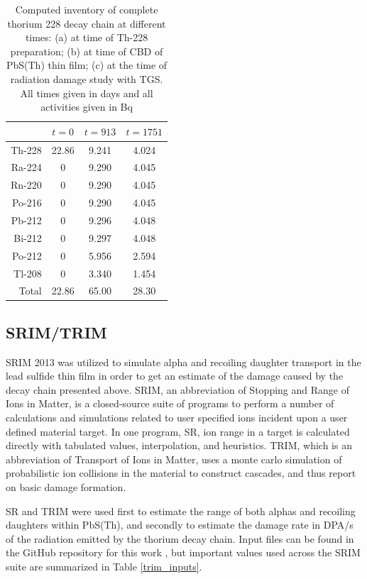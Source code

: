 \begin{table}[th]
\begin{center}
\begin{tabular}{|r|c|c|c|}\hline
		&	$t=0$	&	$t=913$	&	$t=1751$	\\\hline
Th-228	&	22.86	&	9.241	&	4.024	\\
Ra-224	&	0		&	9.290	&	4.045	\\
Rn-220	&	0		&	9.290	&	4.045	\\
Po-216	&	0		&	9.290	&	4.045	\\
Pb-212	&	0		&	9.296	&	4.048	\\
Bi-212	&	0		&	9.297	&	4.048	\\
Po-212	&	0		&	5.956	&	2.594	\\
Tl-208	&	0		&	3.340	&	1.454	\\\hline
Total		&	22.86	&	65.00	&	28.30	\\\hline
\end{tabular}
\end{center}
\caption{Computed inventory of complete thorium 228 decay chain at different times: (a) at time of Th-228 preparation; (b) at time of CBD of PbS(Th) thin film; (c) at the time of radiation damage study with TGS. All times given in days and all activities given in Bq \label{ansatz_decay_chain_inventory}}
\end{table}%


\subsection{SRIM/TRIM}
SRIM 2013 \cite{srim_website} was utilized to simulate alpha and recoiling daughter transport in the lead sulfide thin film in order to get an estimate of the damage caused by the decay chain presented above. SRIM, an abbreviation of Stopping and Range of Ions in Matter, is a closed-source suite of programs to perform a number of calculations and simulations related to user specified ions incident upon a user defined material target. In one program, SR, ion range in a target is calculated directly with tabulated values, interpolation, and heuristics. TRIM, which is an abbreviation of Transport of Ions in Matter, uses a monte carlo simulation of probabilistic ion collisions in the material to construct cascades, and thus report on basic damage formation.

SR and TRIM were used first to estimate the range of both alphas and recoiling daughters within PbS(Th), and secondly to estimate the damage rate in DPA/s of the radiation emitted by the thorium decay chain. Input files can be found in the GitHub repository for this work \cite{Sergheyev2019}, but important values used across the SRIM suite are summarized in Table \ref{trim_inputs}.

